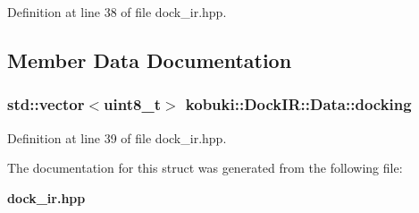 \-Definition at line 38 of file dock\-\_\-ir.\-hpp.



\subsection{\-Member \-Data \-Documentation}
\subsubsection[{docking}]{\setlength{\rightskip}{0pt plus 5cm}std\-::vector$<$uint8\-\_\-t$>$ {\bf kobuki\-::\-Dock\-I\-R\-::\-Data\-::docking}}\label{structkobuki_1_1DockIR_1_1Data_afbd2446312c797f55a32c8f9077a09be}


\-Definition at line 39 of file dock\-\_\-ir.\-hpp.



\-The documentation for this struct was generated from the following file\-:\begin{DoxyCompactItemize}
\item 
{\bf dock\-\_\-ir.\-hpp}\end{DoxyCompactItemize}
